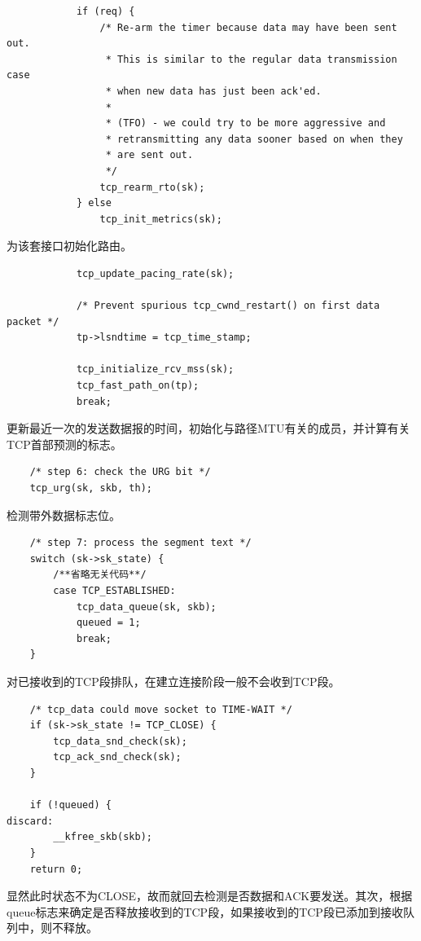 \begin{verbatim}
			if (req) {
				/* Re-arm the timer because data may have been sent out.
				 * This is similar to the regular data transmission case
				 * when new data has just been ack'ed.
				 *
				 * (TFO) - we could try to be more aggressive and
				 * retransmitting any data sooner based on when they
				 * are sent out.
				 */
				tcp_rearm_rto(sk);
			} else
				tcp_init_metrics(sk);
\end{verbatim}

					为该套接口初始化路由。

\begin{verbatim}
			tcp_update_pacing_rate(sk);

			/* Prevent spurious tcp_cwnd_restart() on first data packet */
			tp->lsndtime = tcp_time_stamp;

			tcp_initialize_rcv_mss(sk);
			tcp_fast_path_on(tp);
			break;
\end{verbatim}

				更新最近一次的发送数据报的时间，初始化与路径MTU有关的成员，并计算有关TCP首部预测的标志。

\begin{verbatim}
	/* step 6: check the URG bit */
	tcp_urg(sk, skb, th);
\end{verbatim}

				检测带外数据标志位。

\begin{verbatim}
	/* step 7: process the segment text */
	switch (sk->sk_state) {
		/**省略无关代码**/
		case TCP_ESTABLISHED:
			tcp_data_queue(sk, skb);
			queued = 1;
			break;
	}
\end{verbatim}

				对已接收到的TCP段排队，在建立连接阶段一般不会收到TCP段。

\begin{verbatim}
	/* tcp_data could move socket to TIME-WAIT */
	if (sk->sk_state != TCP_CLOSE) {
		tcp_data_snd_check(sk);
		tcp_ack_snd_check(sk);
	}

	if (!queued) {
discard:
		__kfree_skb(skb);
	}
	return 0;
\end{verbatim}

				显然此时状态不为CLOSE，故而就回去检测是否数据和ACK要发送。其次，根据queue标志来确定是否释放接收到的TCP段，如果接收到的TCP段已添加到接收队列中，则不释放。
